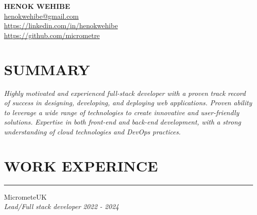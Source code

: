 \documentclass{article}
\begin{document}
\begin{center}
\textbf{\huge HENOK WEHIBE} \\
\vspace{1.5em}
\href{mailto:henokwehibe@gmail.com}{henokwehibe@gmail.com} \\
\vspace{1.0em}
\href{https://linkedin.com/in/henokwehibe}{https://linkedin.com/in/henokwehibe}\\
\vspace{1.0em}
\href{https://github.com/micrometre}{https://github.com/micrometre }\\
\end{center}
\section*{SUMMARY} 
{\em \Large Highly motivated and experienced full-stack developer with a proven track record of success in designing, developing, and deploying web applications. Proven ability to leverage a wide range of technologies to create innovative and user-friendly solutions. Expertise in both front-end and back-end development, with a strong understanding of cloud technologies and DevOps practices.} \hfill 
\vspace{-4.6em}
\section* {WORK EXPERINCE}
\vspace{0.6em}
\hrule 
{\bf}{} MicrometeUK \hfill {} \\%
{\em Lead/Full stack developer} \hfill {\em 2022 - 2024 } %
\end{document}
